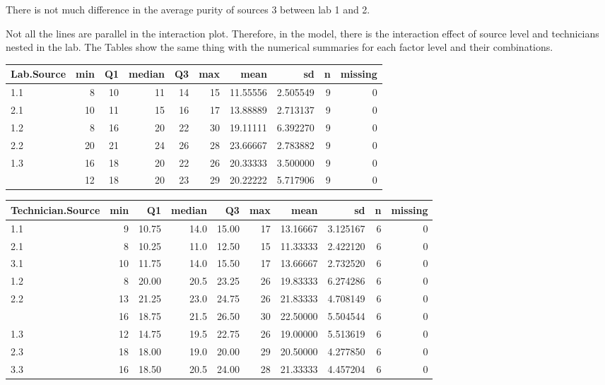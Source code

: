 \documentclass[12pt,]{article}
\begin{document}
There is not much difference in the average purity of sources 3 between
lab 1 and 2.

Not all the lines are parallel in the interaction plot. Therefore, in
the model, there is the interaction effect of source level and
technicians nested in the lab. The Tables show the same thing with the
numerical summaries for each factor level and their combinations.

\begin{table}[H]
\centering\begingroup\fontsize{8}{10}\selectfont

\begin{tabular}{lrrrrr>{\columncolor[HTML]{EAFAF1}}rrrr}
\toprule
Lab.Source & min & Q1 & median & Q3 & max & mean & sd & n & missing\\
\midrule
1.1 & 8 & 10 & 11 & 14 & 15 & 11.55556 & 2.505549 & 9 & 0\\
2.1 & 10 & 11 & 15 & 16 & 17 & 13.88889 & 2.713137 & 9 & 0\\
1.2 & 8 & 16 & 20 & 22 & 30 & 19.11111 & 6.392270 & 9 & 0\\
2.2 & 20 & 21 & 24 & 26 & 28 & 23.66667 & 2.783882 & 9 & 0\\
1.3 & 16 & 18 & 20 & 22 & 26 & 20.33333 & 3.500000 & 9 & 0\\
\addlinespace
2.3 & 12 & 18 & 20 & 23 & 29 & 20.22222 & 5.717906 & 9 & 0\\
\bottomrule
\end{tabular}
\endgroup{}
\end{table}

\begin{table}[H]
\centering\begingroup\fontsize{8}{10}\selectfont

\begin{tabular}{lrrrrr>{\columncolor[HTML]{EAFAF1}}rrrr}
\toprule
Technician.Source & min & Q1 & median & Q3 & max & mean & sd & n & missing\\
\midrule
1.1 & 9 & 10.75 & 14.0 & 15.00 & 17 & 13.16667 & 3.125167 & 6 & 0\\
2.1 & 8 & 10.25 & 11.0 & 12.50 & 15 & 11.33333 & 2.422120 & 6 & 0\\
3.1 & 10 & 11.75 & 14.0 & 15.50 & 17 & 13.66667 & 2.732520 & 6 & 0\\
1.2 & 8 & 20.00 & 20.5 & 23.25 & 26 & 19.83333 & 6.274286 & 6 & 0\\
2.2 & 13 & 21.25 & 23.0 & 24.75 & 26 & 21.83333 & 4.708149 & 6 & 0\\
\addlinespace
3.2 & 16 & 18.75 & 21.5 & 26.50 & 30 & 22.50000 & 5.504544 & 6 & 0\\
1.3 & 12 & 14.75 & 19.5 & 22.75 & 26 & 19.00000 & 5.513619 & 6 & 0\\
2.3 & 18 & 18.00 & 19.0 & 20.00 & 29 & 20.50000 & 4.277850 & 6 & 0\\
3.3 & 16 & 18.50 & 20.5 & 24.00 & 28 & 21.33333 & 4.457204 & 6 & 0\\
\bottomrule
\end{tabular}
\endgroup{}
\end{table}
\end{document}
